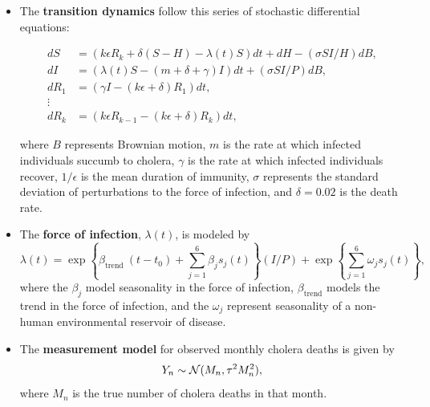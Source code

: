 \documentclass{article}
\begin{document}
\begin{itemize}
    \item The \textbf{transition dynamics} follow this series of stochastic differential equations:

    \begin{align}
        d S&=\left(k \epsilon R_k+\delta(S-H)-\lambda(t) S\right) d t+d H-(\sigma S I / H) d B, \\ 
        d I&=\left(\lambda(t) S-(m+\delta+\gamma) I\right) d t+(\sigma S I / P) d B, \\ 
        d R_1&=\left(\gamma I-(k \epsilon+\delta) R_1\right) d t, \\ 
        \vdots \\ 
        d R_k&=\left(k \epsilon R_{k-1}-(k \epsilon+\delta) R_k\right) d t,
    \end{align}
    
    where $B$ represents Brownian motion, $m$ is the rate at which infected individuals succumb to cholera, $\gamma$ is the rate at which infected individuals recover, $1/\epsilon$ is the mean duration of immunity, $\sigma$ represents the standard deviation of perturbations to the force of infection, and $\delta=0.02$ is the death rate. 

    \item The \textbf{force of infection}, $\lambda(t)$, is modeled by
    \begin{equation}
        \lambda(t)=\exp \left\{\beta_{\text {trend }}\left(t-t_0\right)+\sum_{j=1}^{6} \beta_j s_j(t)\right\}(I / P) + \exp \left\{\sum_{j=1}^{6} \omega_j s_j(t)\right\},
    \end{equation}
    where the $\beta_j$ model seasonality in the force of infection, $\beta_{\text{trend}}$ models the trend in the force of infection, and the $\omega_j$ represent seasonality of a non-human environmental reservoir of disease. 
    \item The \textbf{measurement model} for observed monthly cholera deaths is given by 
    \begin{equation}
        Y_n \sim {\mathcal{N}}(M_n, \tau^2M_n^2),
    \end{equation}
    where $M_n$ is the true number of cholera deaths in that month.
\end{itemize}
\end{document}
